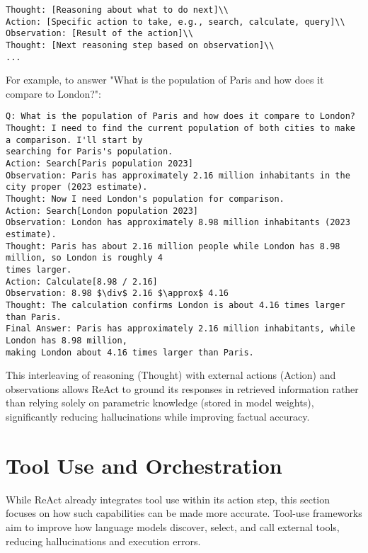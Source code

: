 \begin{lstlisting}[language={},basicstyle=\ttfamily\footnotesize,caption={ReAct Framework Pattern}]
Thought: [Reasoning about what to do next]\\
Action: [Specific action to take, e.g., search, calculate, query]\\
Observation: [Result of the action]\\
Thought: [Next reasoning step based on observation]\\
...
\end{lstlisting}

For example, to answer "What is the population of Paris and how does it compare to London?":

\begin{lstlisting}[language={},breaklines=true,basicstyle=\ttfamily\footnotesize,caption={ReAct Example: Population Comparison Query}]
Q: What is the population of Paris and how does it compare to London?
Thought: I need to find the current population of both cities to make a comparison. I'll start by 
searching for Paris's population.
Action: Search[Paris population 2023]
Observation: Paris has approximately 2.16 million inhabitants in the city proper (2023 estimate).
Thought: Now I need London's population for comparison.
Action: Search[London population 2023]
Observation: London has approximately 8.98 million inhabitants (2023 estimate).
Thought: Paris has about 2.16 million people while London has 8.98 million, so London is roughly 4 
times larger.
Action: Calculate[8.98 / 2.16]
Observation: 8.98 $\div$ 2.16 $\approx$ 4.16
Thought: The calculation confirms London is about 4.16 times larger than Paris.
Final Answer: Paris has approximately 2.16 million inhabitants, while London has 8.98 million, 
making London about 4.16 times larger than Paris.
\end{lstlisting}

This interleaving of reasoning (Thought) with external actions (Action) and observations allows ReAct to ground its responses in retrieved information rather than relying solely on parametric knowledge (stored in model weights), significantly reducing hallucinations while improving factual accuracy.
\section{Tool Use and Orchestration}

While ReAct already integrates tool use within its action step, this section focuses on how such capabilities can be made more accurate.  
Tool-use frameworks aim to improve how language models discover, select, and call external tools, reducing hallucinations and execution errors.  

